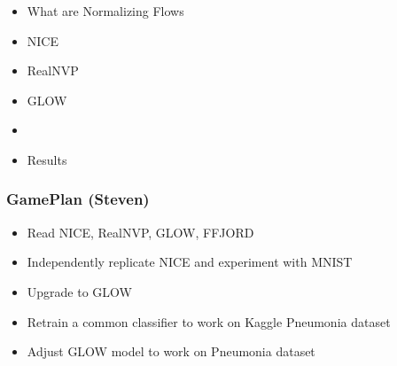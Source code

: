 \begin{frame}
\begin{itemize}
    \item What are Normalizing Flows
    \item NICE
    \item RealNVP
    \item GLOW
    \item \textbf{\color{red}{GamePlan}}
    \item Results
\end{itemize}
\end{frame}

\begin{frame}
    \frametitle{GamePlan (Steven)}
    \begin{itemize}
        \item Read NICE, RealNVP, GLOW, FFJORD
        \item Independently replicate NICE and experiment with MNIST
        \item Upgrade to GLOW
        \item Retrain a common classifier to work on Kaggle Pneumonia dataset
        \item Adjust GLOW model to work on Pneumonia dataset
    \end{itemize}
\end{frame}
